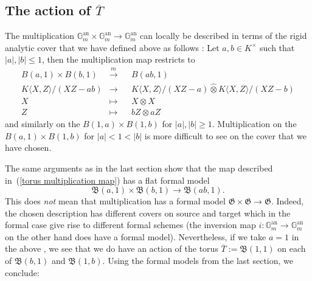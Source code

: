 \documentclass[11pt,oneside]{amsart}
\theoremstyle{definition}
\theoremstyle{remark}
\begin{document}
	\subsection{The action of $\overline{T}$}
	The multiplication $\mathbb G_m^{\operatorname{an}}\times \mathbb G_m^{\operatorname{an}}\rightarrow \mathbb G_m^{\operatorname{an}}$ can locally be described in terms of the rigid analytic cover that we have defined above as follows  : Let $a,b \in K^\times$ such that $|a|,|b|\leq 1$, then the multiplication map restricts to
	\begin{equation}
	\begin{alignedat}{2} \label{torus multiplication map}
	B(a,1)\times B(b,1)&\xrightarrow{m}&& B(ab,1)\\
	K\langle X,Z\rangle/(XZ-ab)&\rightarrow &&K\langle X,Z\rangle/(XZ-a)\widehat{\otimes} K\langle X,Z\rangle/(XZ-b)\\
	X&\mapsto&& X\otimes X\\
	Z&\mapsto&& bZ\otimes aZ
	\end{alignedat}
	\end{equation}
	and similarly on the $B(1,a)\times B(1,b)$ for $|a|,|b|\geq 1$. Multiplication on the $B(a,1)\times B(1,b)$ for $|a|< 1 < |b|$ is more difficult to see on the cover that we have chosen.
	
	The same arguments as in the last section show that the map described in~(\ref{torus multiplication map}) has a flat formal model
	\[\mathfrak B(a,1)\times \mathfrak B(b,1)\rightarrow \mathfrak B(ab,1).\]
	This does \textit{not} mean that multiplication has a formal model $\mathfrak G\times \mathfrak G\rightarrow \mathfrak G$. Indeed, the chosen description has different covers on source and target which in the formal case give rise to different formal schemes (the inversion map $i:\mathbb G_m^{\operatorname{an}}\rightarrow \mathbb G_m^{\operatorname{an}}$ on the other hand does have a formal model). Nevertheless, if we take $a=1$ in the above , we see that we do have an action of the torus $\overline{T}:=\mathfrak B(1,1)$ on each of $\mathfrak B(b,1)$ and $\mathfrak B(1,b)$. Using the formal models from the last section, we conclude:
	
\end{document}
